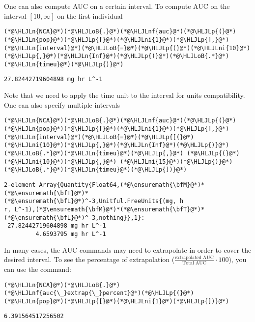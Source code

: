 \documentclass[12pt,a4paper]{article}
\newcommand{\HLJLn}[1]{#1}
\newcommand{\HLJLnf}[1]{\textcolor[RGB]{66,102,213}{#1}}
\newcommand{\HLJLni}[1]{\textcolor[RGB]{59,151,46}{#1}}
\newcommand{\HLJLoB}[1]{\textcolor[RGB]{102,102,102}{\textbf{#1}}}
\newcommand{\HLJLp}[1]{#1}
\begin{document}
One can also compute AUC on a certain interval. To compute AUC on the interval $[10, \infty]$ on the first individual


\begin{lstlisting}
(*@\HLJLn{NCA}@*)(*@\HLJLoB{.}@*)(*@\HLJLnf{auc}@*)(*@\HLJLp{(}@*)(*@\HLJLn{pop}@*)(*@\HLJLp{[}@*)(*@\HLJLni{1}@*)(*@\HLJLp{],}@*) (*@\HLJLn{interval}@*)(*@\HLJLoB{=}@*)(*@\HLJLp{(}@*)(*@\HLJLni{10}@*)(*@\HLJLp{,}@*)(*@\HLJLn{Inf}@*)(*@\HLJLp{)}@*)(*@\HLJLoB{.*}@*)(*@\HLJLn{timeu}@*)(*@\HLJLp{)}@*)
\end{lstlisting}

\begin{lstlisting}
27.82442719604898 mg hr L^-1
\end{lstlisting}


Note that we need to apply the time unit to the interval for units compatibility. One can also specify multiple intervals


\begin{lstlisting}
(*@\HLJLn{NCA}@*)(*@\HLJLoB{.}@*)(*@\HLJLnf{auc}@*)(*@\HLJLp{(}@*)(*@\HLJLn{pop}@*)(*@\HLJLp{[}@*)(*@\HLJLni{1}@*)(*@\HLJLp{],}@*) (*@\HLJLn{interval}@*)(*@\HLJLoB{=}@*)(*@\HLJLp{[(}@*)(*@\HLJLni{10}@*)(*@\HLJLp{,}@*)(*@\HLJLn{Inf}@*)(*@\HLJLp{)}@*)(*@\HLJLoB{.*}@*)(*@\HLJLn{timeu}@*)(*@\HLJLp{,}@*) (*@\HLJLp{(}@*)(*@\HLJLni{10}@*)(*@\HLJLp{,}@*) (*@\HLJLni{15}@*)(*@\HLJLp{)}@*)(*@\HLJLoB{.*}@*)(*@\HLJLn{timeu}@*)(*@\HLJLp{])}@*)
\end{lstlisting}

\begin{lstlisting}
2-element Array{Quantity{Float64,(*@\ensuremath{\bfM}@*)*(*@\ensuremath{\bfT}@*)*(*@\ensuremath{\bfL}@*)^-3,Unitful.FreeUnits{(mg, h
r, L^-1),(*@\ensuremath{\bfM}@*)*(*@\ensuremath{\bfT}@*)*(*@\ensuremath{\bfL}@*)^-3,nothing}},1}:
 27.82442719604898 mg hr L^-1
         4.6593795 mg hr L^-1
\end{lstlisting}


In many cases, the AUC commands may need to extrapolate in order to cover the desired interval. To see the percentage of extrapolation ($\frac{\text{extrapolated AUC}}{\text{Total AUC}}\cdot 100$), you can use the command:


\begin{lstlisting}
(*@\HLJLn{NCA}@*)(*@\HLJLoB{.}@*)(*@\HLJLnf{auc{\_}extrap{\_}percent}@*)(*@\HLJLp{(}@*)(*@\HLJLn{pop}@*)(*@\HLJLp{[}@*)(*@\HLJLni{1}@*)(*@\HLJLp{])}@*)
\end{lstlisting}

\begin{lstlisting}
6.391564517256502
\end{lstlisting}
\end{document}
